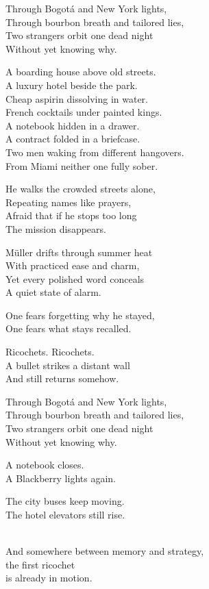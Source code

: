 \begin{lyrics}
 Through Bogotá and New York lights,\\
 Through bourbon breath and tailored lies,\\
Two strangers orbit one dead night\\
Without yet knowing why.

 A boarding house above old streets.\\
 A luxury hotel beside the park.\\
 Cheap aspirin dissolving in water.\\
 French cocktails under painted kings.\\
 A notebook hidden in a drawer.\\
 A contract folded in a briefcase.\\
 Two men waking from different hangovers.\\
 From Miami neither one fully sober.

He walks the crowded streets alone,\\
Repeating names like prayers,\\
Afraid that if he stops too long\\
The mission disappears.

Müller drifts through summer heat\\
With practiced ease and charm,\\
Yet every polished word conceals\\
A quiet state of alarm.

 One fears forgetting why he stayed,\\
 One fears what stays recalled.

 Ricochets. %
 Ricochets.\\
A bullet strikes a distant wall\\
And still returns somehow.

 Through Bogotá and New York lights,\\
 Through bourbon breath and tailored lies,\\
Two strangers orbit one dead night\\
Without yet knowing why.

 A notebook closes.\\
 A Blackberry lights again.

 The city buses keep moving.\\
 The hotel elevators still rise.

\\
And somewhere between memory and strategy,\\
the first ricochet\\
is already in motion.

\end{lyrics}
